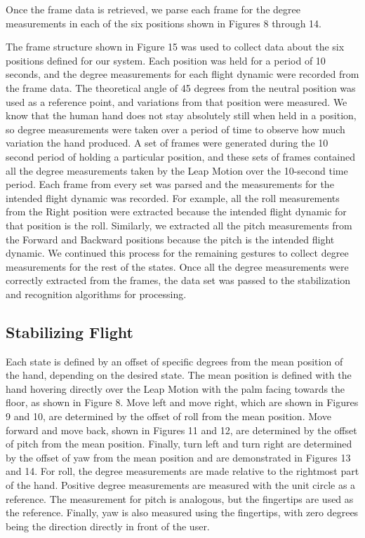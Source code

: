 \documentclass[letterpaper,english, 12pt]{article}
\begin{document}
Once the frame data is retrieved, we parse each frame for the degree measurements in each of the six positions shown in Figures 8 through 14.

The frame structure shown in Figure 15 was used to collect data about the six positions defined for our system. Each position was held for a period of 10 seconds, and the degree measurements for each flight dynamic were recorded from the frame data. The theoretical angle of 45 degrees from the neutral position was used as a reference point, and variations from that position were measured. We know that the human hand does not stay absolutely still when held in a position, so degree measurements were taken over a period of time to observe how much variation the hand produced. A set of frames were generated during the 10 second period of holding a particular position, and these sets of frames contained all the degree measurements taken by the Leap Motion over the 10-second time period. Each frame from every set was parsed and the measurements for the intended flight dynamic was recorded. For example,  all the roll measurements from the Right position were extracted because the intended flight dynamic for that position is the roll. Similarly, we extracted all the pitch measurements from the Forward and Backward positions because the pitch is the intended flight dynamic. We continued this process for the remaining gestures to collect degree measurements for the rest of the states. Once all the degree measurements were correctly extracted from the frames, the data set was passed to the stabilization and recognition algorithms for processing.


\subsection*{Stabilizing Flight}

Each state is defined by an offset of specific degrees from the mean position of the hand, depending on the desired state. The mean position is defined with the hand hovering directly over the Leap Motion with the palm facing towards the floor, as shown in Figure 8. Move left and move right, which are shown in Figures 9 and 10, are determined by the offset of roll from the mean position. Move forward and move back, shown in Figures 11 and 12,  are determined by the offset of pitch from the mean position. Finally, turn left and turn right are determined by the offset of yaw from the mean position and are demonstrated in Figures 13 and 14. For roll, the degree measurements are made relative to the rightmost part of the hand. Positive degree measurements are measured with the unit circle as a reference. The measurement for pitch is analogous, but the fingertips are used as the reference. Finally, yaw is also measured using the fingertips, with zero degrees being the direction directly in front of the user.
\end{document}
